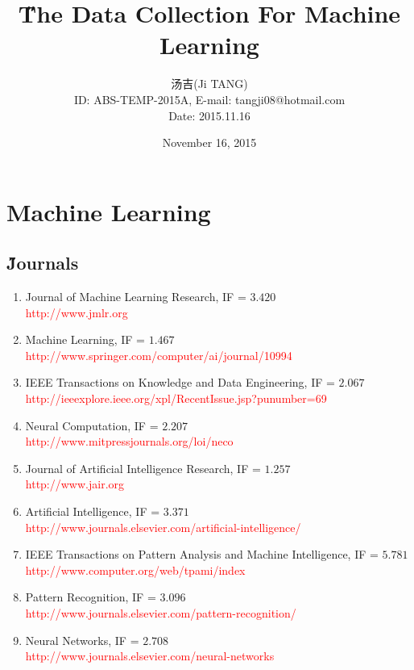 \documentclass[a4paper,12pt,oneside]{book}
\title{{\H The Data Collection For Machine Learning}\quad {ABS-TEMP-2015A-No.002-TJx}}
\author{汤吉(Ji TANG)\\
               ID: ABS-TEMP-2015A,  E-mail: tangji08@hotmail.com \\
        Date: 2015.11.16}
\date{November 16, 2015}
\newcommand{\red}[1]{  \textcolor{red}  {#1}}   %
\begin{document}
  
\maketitle
\pagestyle{fancy}
\fancyhead[LO,RE]{\leftmark} %



\renewcommand{\headrulewidth}{0.4pt}
\renewcommand{\footrulewidth}{0.4pt}


\clearpage{\pagestyle{empty}\cleardoublepage}

\tableofcontents 
\newpage
\clearpage{\pagestyle{empty}\cleardoublepage}
\chapter{\E Machine Learning}


\section{\H Journals}
\begin{enumerate}
\item Journal of Machine Learning Research, IF = $3.420$
\\\qquad \red{http://www.jmlr.org}
\item Machine Learning, IF = $1.467$
\\\qquad \red{http://www.springer.com/computer/ai/journal/10994}
\item IEEE Transactions on Knowledge and Data Engineering, IF = $2.067$
\\\qquad \red{http://ieeexplore.ieee.org/xpl/RecentIssue.jsp?punumber=69}
\item Neural Computation, IF = $2.207$
\\\qquad \red{http://www.mitpressjournals.org/loi/neco}
\item Journal of Artificial Intelligence Research, IF = $1.257$
\\\qquad \red{http://www.jair.org}
\item Artificial Intelligence, IF = $3.371$
\\\qquad \red{http://www.journals.elsevier.com/artificial-intelligence/}
\item IEEE Transactions on Pattern Analysis and Machine Intelligence, IF = $5.781$
\\\qquad \red{http://www.computer.org/web/tpami/index}
\item Pattern Recognition, IF = $3.096$
\\\qquad \red{http://www.journals.elsevier.com/pattern-recognition/}
\item Neural Networks, IF = $2.708$
\\\qquad \red{http://www.journals.elsevier.com/neural-networks}
\end{enumerate}
\end{document}
